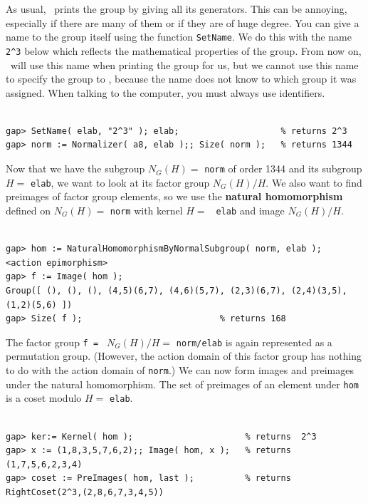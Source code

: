 \noindent As usual, \gap\ prints the group by giving all its generators. This can be annoying, especially if there are
many of them or if they are of huge degree.  You can give a name to the group itself using
the function {\tt SetName}. 
We do this with the name \verb.2^3. below which reflects the mathematical properties of the
group. From now on, \gap\ will use this name when printing the group for us, but we cannot use this
name to specify the group to \gap, because the name does not know to which group it
was assigned.  When talking to the computer, you must always use identifiers.
{\codesize
\begin{verbatim}

gap> SetName( elab, "2^3" ); elab;                    % returns 2^3
gap> norm := Normalizer( a8, elab );; Size( norm );   % returns 1344

\end{verbatim}}
\noindent Now that we have the subgroup $N_G(H)= $ {\tt norm} of order 1344 and its subgroup $H=
$ {\tt elab}, we want to look at its factor
group $N_G(H)/H$. We also want to find preimages of factor group elements, so we use
the {\bf natural homomorphism} defined on $N_G(H)= $ {\tt norm} with kernel $H= $ {\tt
  elab} and image $N_G(H)/H$.
{\codesize
\begin{verbatim}

gap> hom := NaturalHomomorphismByNormalSubgroup( norm, elab );
<action epimorphism>
gap> f := Image( hom );
Group([ (), (), (), (4,5)(6,7), (4,6)(5,7), (2,3)(6,7), (2,4)(3,5),(1,2)(5,6) ])
gap> Size( f );                           % returns 168

\end{verbatim}}
\noindent The factor group {\tt f = } $ N_G(H)/H = $ {\tt norm/elab} is again represented as a permutation
group. 
(However, the action domain of this factor group has nothing to do with the action
domain of {\tt norm}.)
We can now form images and preimages under the natural homomorphism. The set of
preimages of an element under {\tt hom} is a coset modulo $H= $ {\tt elab}. 
{\codesize
\begin{verbatim}

gap> ker:= Kernel( hom );                      % returns  2^3
gap> x := (1,8,3,5,7,6,2);; Image( hom, x );   % returns  (1,7,5,6,2,3,4)
gap> coset := PreImages( hom, last );          % returns  RightCoset(2^3,(2,8,6,7,3,4,5))

\end{verbatim}}
